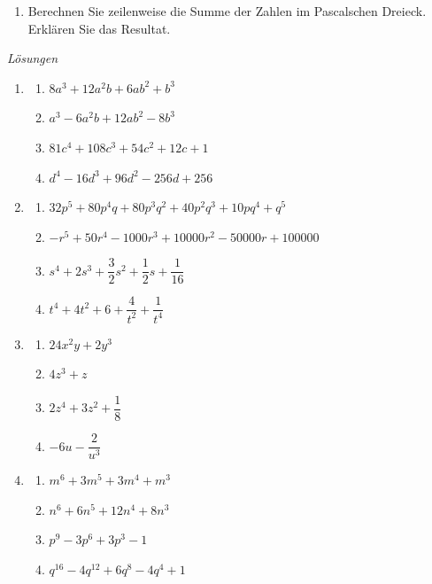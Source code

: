 \begin{ueb}
\begin{enumerate}
\begin{enumerate}
                  \item Berechnen Sie zeilenweise die Summe der Zahlen im
                        Pascalschen Dreieck. Erklären Sie das Resultat.
              \end{enumerate}
    \end{enumerate}
\end{ueb}

\clearpage
\emph{Lösungen}
\begin{enumerate}
    \item
          \begin{enumerate}
              \item \(8a^3+12a^2b+6ab^2+b^3\)
              \item \(a^3-6a^2b+12ab^2-8b^3\)
              \item \(81c^4+108c^3+54c^2+12c+1\)
              \item \(d^4-16d^3+96d^2-256d+256\)
          \end{enumerate}

    \item
          \begin{enumerate}
              \item \(32p^5+80p^4q+80p^3q^2+40p^2q^3+10pq^4+q^5\)
              \item \(-r^5+50r^4-1000r^3+10000r^2-50000r+100000\)
              \item \(s^4+2s^3+\dfrac{3}{2}s^2+\dfrac{1}{2}s+\dfrac{1}{16}\)
              \item \(t^4+4t^2+6+\dfrac{4}{t^2}+\dfrac{1}{t^4}\)
          \end{enumerate}

    \item
          \begin{enumerate}
              \item \(24x^2y+2y^3\)
              \item \(4z^3+z\)
              \item \(2z^4+3z^2+\dfrac{1}{8}\)
              \item \(-6u-\dfrac{2}{u^3}\)
          \end{enumerate}

    \item
          \begin{enumerate}
              \item \(m^6+3m^5+3m^4+m^3\)
              \item \(n^6+6n^5+12n^4+8n^3\)
              \item \(p^9-3p^6+3p^3-1\)
              \item \(q^{16}-4q^{12}+6q^8-4q^4+1\)
          \end{enumerate}
\end{enumerate}































